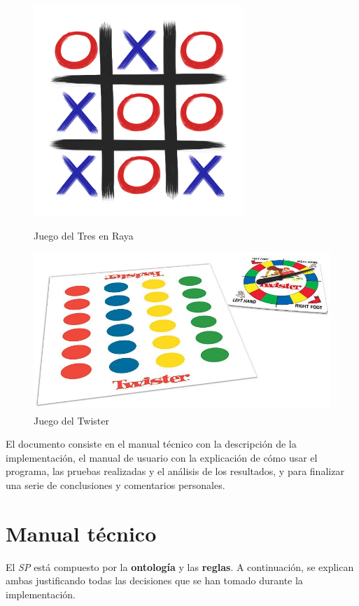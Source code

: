 \documentclass{uc3mpracticas}
\begin{document}
\begin{figure}[!h]
  \centering
  \begin{minipage}{.52\textwidth}
    \centering
    \includegraphics[width=.5\linewidth]{Images/3enraya.png}
    \caption*{Juego del Tres en Raya}
  \end{minipage}%
  \begin{minipage}{.52\textwidth}
    \centering
    \includegraphics[width=.8\linewidth]{Images/twister.jpg}
    \caption*{Juego del Twister}
  \end{minipage}
\end{figure}

El documento consiste en el manual técnico con la descripción de la implementación, el manual de usuario con la explicación de cómo usar el programa, las pruebas realizadas y el análisis de los resultados, y para finalizar una serie de conclusiones y comentarios personales.


  \newpage

  \section{Manual técnico}

  El \textit{SP} está compuesto por la \textbf{ontología} y las \textbf{reglas}. A continuación, se explican ambas justificando todas las decisiones que se han tomado durante la implementación.
\end{document}
